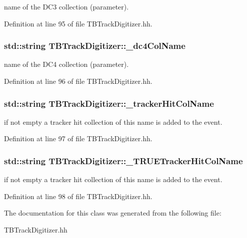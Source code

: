 name of the D\-C3 collection (parameter). 



Definition at line 95 of file T\-B\-Track\-Digitizer.\-hh.

\subsubsection[{\-\_\-dc4\-Col\-Name}]{\setlength{\rightskip}{0pt plus 5cm}std\-::string T\-B\-Track\-Digitizer\-::\-\_\-dc4\-Col\-Name\hspace{0.3cm}{\ttfamily [protected]}}\label{classTBTrackDigitizer_af81e1cc15ed1b7a95601f4531e0407e2}


name of the D\-C4 collection (parameter). 



Definition at line 96 of file T\-B\-Track\-Digitizer.\-hh.

\subsubsection[{\-\_\-tracker\-Hit\-Col\-Name}]{\setlength{\rightskip}{0pt plus 5cm}std\-::string T\-B\-Track\-Digitizer\-::\-\_\-tracker\-Hit\-Col\-Name\hspace{0.3cm}{\ttfamily [protected]}}\label{classTBTrackDigitizer_a89170451358f13de1fb6391f8c16e3be}


if not empty a tracker hit collection of this name is added to the event. 



Definition at line 97 of file T\-B\-Track\-Digitizer.\-hh.

\subsubsection[{\-\_\-\-T\-R\-U\-E\-Tracker\-Hit\-Col\-Name}]{\setlength{\rightskip}{0pt plus 5cm}std\-::string T\-B\-Track\-Digitizer\-::\-\_\-\-T\-R\-U\-E\-Tracker\-Hit\-Col\-Name\hspace{0.3cm}{\ttfamily [protected]}}\label{classTBTrackDigitizer_a05101ed4c3f17c4c75b6386eab702b39}


if not empty a tracker hit collection of this name is added to the event. 



Definition at line 98 of file T\-B\-Track\-Digitizer.\-hh.



The documentation for this class was generated from the following file\-:\begin{DoxyCompactItemize}
\item 
T\-B\-Track\-Digitizer.\-hh\end{DoxyCompactItemize}
